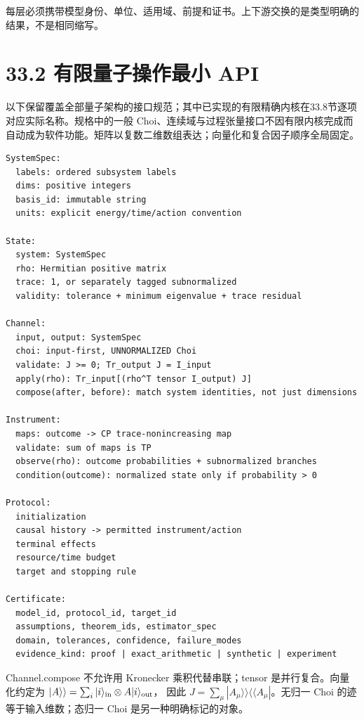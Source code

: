 \documentclass[
  11pt,
  oneside]{book}
\begin{document}
每层必须携带模型身份、单位、适用域、前提和证书。上下游交换的是类型明确的结果，不是相同缩写。

\hypertarget{ux6709ux9650ux91cfux5b50ux64cdux4f5cux6700ux5c0f-api}{%
\section{33.2 有限量子操作最小
API}\label{ux6709ux9650ux91cfux5b50ux64cdux4f5cux6700ux5c0f-api}}

以下保留覆盖全部量子架构的接口规范；其中已实现的有限精确内核在33.8节逐项对应实际名称。规格中的一般
Choi、连续域与过程张量接口不因有限内核完成而自动成为软件功能。矩阵以复数二维数组表达；向量化和复合因子顺序全局固定。

\begin{Verbatim}[breaklines,breakanywhere,fontsize=\scriptsize]
SystemSpec:
  labels: ordered subsystem labels
  dims: positive integers
  basis_id: immutable string
  units: explicit energy/time/action convention

State:
  system: SystemSpec
  rho: Hermitian positive matrix
  trace: 1, or separately tagged subnormalized
  validity: tolerance + minimum eigenvalue + trace residual

Channel:
  input, output: SystemSpec
  choi: input-first, UNNORMALIZED Choi
  validate: J >= 0; Tr_output J = I_input
  apply(rho): Tr_input[(rho^T tensor I_output) J]
  compose(after, before): match system identities, not just dimensions

Instrument:
  maps: outcome -> CP trace-nonincreasing map
  validate: sum of maps is TP
  observe(rho): outcome probabilities + subnormalized branches
  condition(outcome): normalized state only if probability > 0

Protocol:
  initialization
  causal history -> permitted instrument/action
  terminal effects
  resource/time budget
  target and stopping rule

Certificate:
  model_id, protocol_id, target_id
  assumptions, theorem_ids, estimator_spec
  domain, tolerances, confidence, failure_modes
  evidence_kind: proof | exact_arithmetic | synthetic | experiment
\end{Verbatim}

Channel.compose 不允许用 Kronecker 乘积代替串联；tensor
是并行复合。向量化约定为
\(|A\rangle\rangle=\sum_i|i\rangle_{\rm in}\otimes A|i\rangle_{\rm out}\)，
因此 \(J=\sum_\mu|A_\mu\rangle\rangle\langle\langle A_\mu|\)。无归一
Choi 的迹等于输入维数；态归一 Choi 是另一种明确标记的对象。
\end{document}
